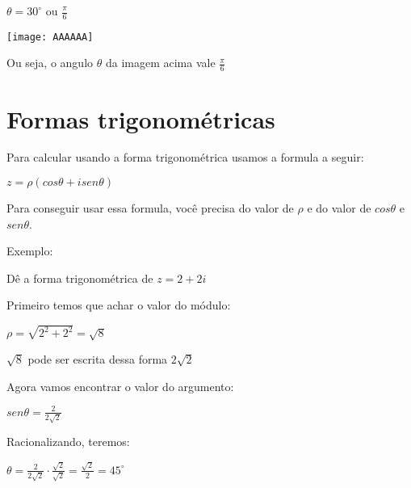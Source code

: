 \documentclass[]{article}
\begin{document}
\begin{large}
\begin{flushleft}
\begin{center}
    $\theta=30^{\circ}$ ou $\frac{\pi}{6}$
\end{center}

\texttt{[image: AAAAAA]}

Ou seja, o angulo $\theta$ da imagem acima vale $\frac{\pi}{6}$ \vspace{.3cm}

\section{Formas trigonométricas}

Para calcular usando a forma trigonométrica usamos a formula a seguir: \vspace{.3cm}

\begin{center}
    $z=\rho(cos\theta + isen\theta)$ \vspace{.3cm}
\end{center}

Para conseguir usar essa formula, você precisa do valor de $\rho$ e do valor de $cos\theta$ e $sen\theta$. \vspace{.3cm}

Exemplo: \vspace{.3cm}

Dê a forma trigonométrica de $z=2+2i$

Primeiro temos que achar o valor do módulo: \vspace{.3cm}

\begin{center}
    $\rho=\sqrt{2^2+2^2} = \sqrt{8}$
    
    $\sqrt{8}$ pode ser escrita dessa forma $2\sqrt{2}$ \vspace{.3cm}
\end{center}

Agora vamos encontrar o valor do argumento: \vspace{.3cm}

\begin{center}
    $sen\theta=\frac{2}{2\sqrt{2}}$
\end{center}

Racionalizando, teremos: \vspace{.3cm}

\begin{center}
    $\theta=\frac{2}{2\sqrt{2}} \cdot \frac{\sqrt{2}}{\sqrt{2}} = \frac{\sqrt{2}}{2} = 45^\circ$ \vspace{.3cm}
\end{center}


\end{flushleft}
\end{large}
\end{document}
